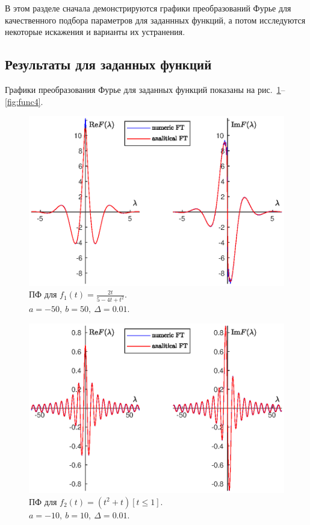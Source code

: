 \documentclass[12pt, a4paper]{article} %
\renewcommand{\le}{\leqslant}
\begin{document}
В этом разделе сначала демонстрируются графики преобразований Фурье для 
качественного подбора параметров для заданнных функций, а потом исследуются
некоторые искажения и варианты их устранения.

\subsection{Результаты для заданных функций}

Графики преобразования Фурье для заданных функций показаны на рис.~\ref{fig:func1}--\ref{fig:func4}.

\begin{figure}[b]
    \centering
    \includegraphics[width=\textwidth]{figures/func1.eps}
    \caption{ПФ для $f_1(t) = \frac{2t}{5 - 4t + t^2}$.\\
    $a = -50,\ b = 50,\ \Delta = 0.01$.}
    \label{fig:func1}
\end{figure}

\begin{figure}[b]
    \centering
    \includegraphics[width=\textwidth]{figures/func2.eps}
    \caption{ПФ для $f_2(t) = \left( t^2 + t \right)[t \le 1]$.\\
    $a = -10,\ b = 10,\ \Delta = 0.01$.}
    \label{fig:func2}
\end{figure}
\end{document}
